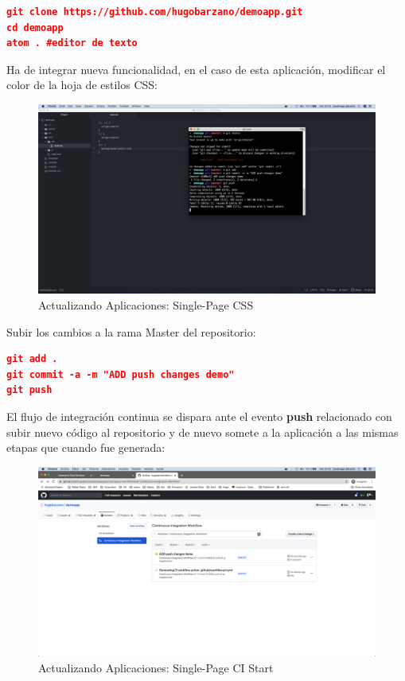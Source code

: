 \documentclass[a4paper,11pt]{book}
\begin{document}
\begin{lstlisting}[language=json,firstnumber=1]
git clone https://github.com/hugobarzano/demoapp.git
cd demoapp
atom . #editor de texto
\end{lstlisting}

 Ha de integrar nueva funcionalidad, en el caso de esta aplicación, modificar el color de la hoja de estilos CSS:
 
 \begin{figure}[H]
\centering
\includegraphics[scale=0.2]{imagenes/casouso/2_5.png}
\caption{ Actualizando Aplicaciones: Single-Page CSS   }
\end{figure}

 Subir los cambios a la rama Master del repositorio:
 
 
\begin{lstlisting}[language=json,firstnumber=1]
git add .
git commit -a -m "ADD push changes demo"
git push
\end{lstlisting}


 
 El flujo de integración continua se dispara ante el evento \textbf{push} relacionado con subir nuevo código al repositorio y de nuevo somete a la aplicación a las mismas etapas que cuando fue generada:
 
  \begin{figure}[H]
\centering
\includegraphics[scale=0.2]{imagenes/casouso/2_6.png}
\caption{  Actualizando Aplicaciones: Single-Page CI Start }
\end{figure}
\end{document}
